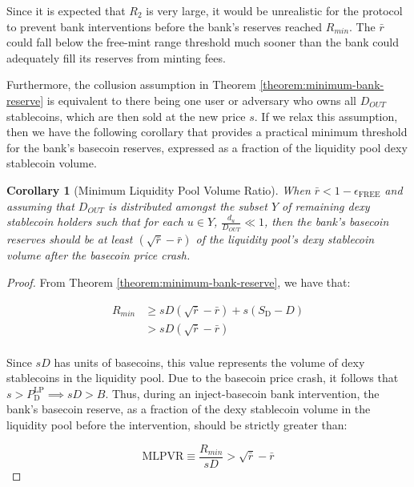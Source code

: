 \documentclass{ifcolog}
\newcommand{\Plp}{P_{\mathrm{D}}^{\mathrm{LP}}}
\newcommand{\Sd}{S_{\mathrm{D}}}
\newcommand{\rr}{\bar{r}}
\newcommand{\epsilonfree}{\epsilon_{\textrm{FREE}}}
\newtheorem{corollary}{Corollary}
\begin{document}
Since it is expected that $R_2$ is very large, it would be unrealistic for the protocol to prevent bank interventions 
before the bank's reserves reached $R_{min}$. The $\rr$ could fall below the free-mint range threshold much sooner than the
bank could adequately fill its reserves from minting fees. 

Furthermore, the collusion assumption in Theorem \ref{theorem:minimum-bank-reserve} is equivalent to there being 
one user or adversary who owns all $D_{OUT}$ stablecoins, which are then sold at the new price $s$. 
If we relax this assumption, then we have the following corollary that provides a practical minimum threshold 
for the bank's basecoin reserves, expressed as a fraction of the liquidity pool dexy stablecoin volume.  

\begin{corollary}[Minimum Liquidity Pool Volume Ratio]
  When $\rr < 1 - \epsilonfree$ and assuming that $D_{OUT}$ is distributed amongst the subset $Y$ of remaining dexy stablecoin holders such that for each $u \in Y$, 
  $\frac{d_u}{D_{OUT}} \ll 1$, then the bank's basecoin reserves should be at least $(\sqrt{\rr} - \rr)$ of the liquidity pool's dexy stablecoin volume
  after the basecoin price crash.
\end{corollary}

\begin{proof}
  From Theorem \ref{theorem:minimum-bank-reserve}, we have that:
  
  \begin{align}
    R_{min} &\ge sD \left( \sqrt{\rr} - \rr \right) + s\left(\Sd - D\right) \\
            &> sD \left( \sqrt{\rr} - \rr \right) \\
  \end{align}
  
  Since $sD$ has units of basecoins, this value represents the volume of dexy stablecoins in the liquidity pool.
  Due to the basecoin price crash, it follows that $s > \Plp \implies sD > B$. Thus, during an inject-basecoin bank intervention, 
  the bank's basecoin reserve, as a fraction of the dexy stablecoin volume in the liquidity pool before the intervention, 
  should be strictly greater than:

  \begin{equation}
    \label{eq:MLPVR}
    \textrm{MLPVR} \equiv \frac{R_{min}}{sD} > \sqrt{\rr} - \rr  
  \end{equation}

\end{proof}
\end{document}
